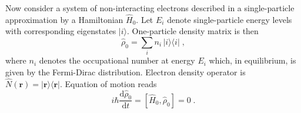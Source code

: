 \documentclass[a4paper,12pt]{article}
\begin{document}
    Now consider a system of non-interacting electrons described in a single-particle approximation by a Hamiltonian $\hat H_0$. Let $E_i$ denote single-particle energy levels with corresponding eigenstates $| i \rangle$. One-particle density matrix is then
    \begin{equation} \label{eq:rho_0}
        \hat\rho_0 = \sum_i n_i \, | i \rangle\! \langle i|\; , 
    \end{equation}
    where $n_i$ denotes the occupational number at energy $E_i$ which, in equilibrium, is given by the Fermi-Dirac distribution. Electron density operator is $\hat N(\mathbf{r}) = |\mathbf{r}\rangle \! \langle \mathbf{r}|$. Equation of motion reads
    \begin{equation*}
        i\hbar\frac{\text{d}\hat\rho_0}{\text{d}t} = [\hat H_0, \hat\rho_0 ] = 0\; .
    \end{equation*}
    
\end{document}
